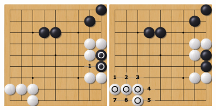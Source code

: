 \documentclass[compress, color = usenames, dvipsnames]{beamer}
\begin{document}
{\begin{center}
       { \includegraphics[width=0.4\textwidth]{figs/gorule_string5.png} }%
       { \includegraphics[width=0.4\textwidth]{figs/gorule_string6.png} }
  \end{center}

}
\end{document}
